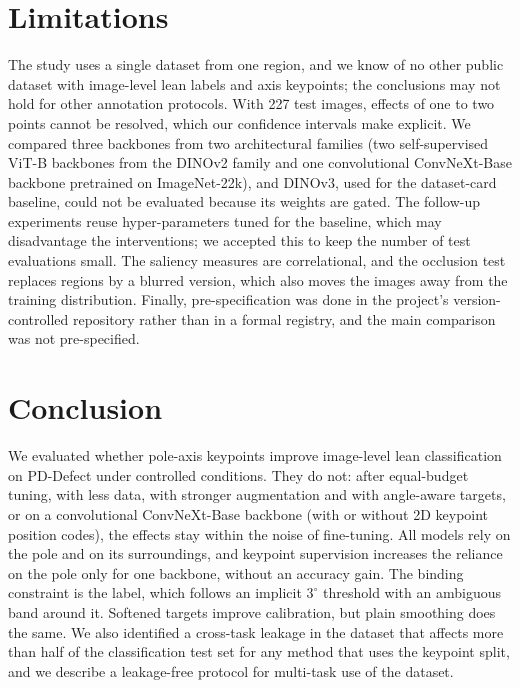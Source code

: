 \documentclass[11pt]{article}
\begin{document}
\section{Limitations}
\label{sec:limitations}
The study uses a single dataset from one region, and we know of no other public dataset with image-level lean
labels and axis keypoints; the conclusions may not hold for other annotation protocols. With 227 test images,
effects of one to two points cannot be resolved, which our confidence intervals make explicit. We compared three
backbones from two architectural families (two self-supervised ViT-B backbones from the DINOv2 family and one convolutional ConvNeXt-Base backbone pretrained on ImageNet-22k), and DINOv3, used for the dataset-card baseline, could not be evaluated because
its weights are gated. The follow-up experiments reuse hyper-parameters tuned for the baseline, which may
disadvantage the interventions; we accepted this to keep the number of test evaluations small. The
saliency measures are correlational, and the occlusion test replaces regions by a blurred version, which also
moves the images away from the training distribution. Finally,
pre-specification was done in the project's version-controlled repository rather than in a formal registry, and the main comparison
was not pre-specified.

\section{Conclusion}
\label{sec:conclusion}
We evaluated whether pole-axis keypoints improve image-level lean classification on PD-Defect under
controlled conditions. They do not: after equal-budget tuning, with less data, with stronger augmentation and
with angle-aware targets, or on a convolutional ConvNeXt-Base backbone (with or without 2D keypoint position codes), the effects stay within the noise of fine-tuning. All models rely on the pole and
on its surroundings, and keypoint supervision increases the reliance on the pole only for one backbone,
without an accuracy gain. The binding constraint is the label, which follows an implicit
$3^\circ$ threshold with an ambiguous band around it. Softened targets improve calibration, but plain
smoothing does the same. We also identified a cross-task leakage in the dataset that affects more than half
of the classification test set for any method that uses the keypoint split, and we describe a leakage-free
protocol for multi-task use of the dataset.
\end{document}
